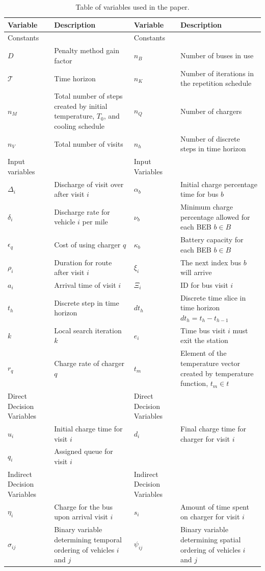 \documentclass[11pt,a4paper,final]{article}
\newcommand{\T}{\mathcal{T}}                %
\newcommand{\Tau}{T}                        %
\newcommand{\Bset}{B}                       %
\begin{document}
\begin{table}[htbp]
\caption{\label{tab:variables}Table of variables used in the paper.}
\centering
\begin{tabularx}{\textwidth}{L{0.3} L{1.2} L{0.3} L{1.2}}
\textbf{Variable} & \textbf{Description} & \textbf{Variable} & \textbf{Description}\\[0pt]
\hline
Constants &  & Constants & \\[0pt]
\(D\) & Penalty method gain factor & \(n_B\) & Number of buses in use\\[0pt]
\(\T\) & Time horizon & \(n_K\) & Number of iterations in the repetition schedule\\[0pt]
\(n_M\) & Total number of steps created by initial temperature, \(\Tau_0\), and cooling schedule & \(n_Q\) & Number of chargers\\[0pt]
\(n_V\) & Total number of visits & \(n_h\) & Number of discrete steps in time horizon\\[0pt]
\hline
Input variables &  & Input Variables & \\[0pt]
\(\Delta_i\) & Discharge of visit over after visit \(i\) & \(\alpha_b\) & Initial charge percentage time for bus \(b\)\\[0pt]
\(\delta_i\) & Discharge rate for vehicle \(i\) per mile & \(\nu_b\) & Minimum charge percentage allowed for each BEB \(b \in \Bset\)\\[0pt]
\(\epsilon_q\) & Cost of using charger \(q\) & \(\kappa_b\) & Battery capacity for each BEB \(b \in \Bset\)\\[0pt]
\(\rho_i\) & Duration for route after visit \(i\) & \(\xi_i\) & The next index bus \(b\) will arrive\\[0pt]
\(a_i\) & Arrival time of visit \(i\) & \(\Xi_i\) & ID for bus visit \(i\)\\[0pt]
\(t_h\) & Discrete step in time horizon & \(dt_h\) & Discrete time slice in time horizon \(dt_h = t_h - t_{h-1}\)\\[0pt]
\(k\) & Local search iteration \(k\) & \(e_i\) & Time bus visit \(i\) must exit the station\\[0pt]
\(r_q\) & Charge rate of charger \(q\) & \(t_m\) & Element of the temperature vector created by temperature function, \(t_m \in t\)\\[0pt]
\hline
Direct Decision Variables &  & Direct Decision Variables & \\[0pt]
\(u_i\) & Initial charge time for visit \(i\) & \(d_i\) & Final charge time for charger for visit \(i\)\\[0pt]
\(q_i\) & Assigned queue for visit \(i\) &  & \\[0pt]
Indirect Decision Variables &  & Indirect Decision Variables & \\[0pt]
\(\eta_i\) & Charge for the bus upon arrival visit \(i\) & \(s_i\) & Amount of time spent on charger for visit \(i\)\\[0pt]
\(\sigma_{ij}\) & Binary variable determining temporal ordering of vehicles \(i\) and \(j\) & \(\psi_{ij}\) & Binary variable determining spatial ordering of vehicles \(i\) and \(j\)\\[0pt]
\hline
\end{tabularx}
\end{table}
\end{document}
